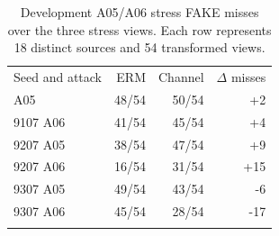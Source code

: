 \begin{table}[t]
\centering
\small
\caption{Development A05/A06 stress FAKE misses over the three stress views. Each row represents 18 distinct sources and 54 transformed views.}\label{tab:attack}
\begin{tabular}{@{}lrrr@{}}
\toprule
Seed and attack & ERM & Channel & $\Delta$ misses \\
\colrule
9107 A05 & 48/54 & 50/54 & +2 \\
9107 A06 & 41/54 & 45/54 & +4 \\
9207 A05 & 38/54 & 47/54 & +9 \\
9207 A06 & 16/54 & 31/54 & +15 \\
9307 A05 & 49/54 & 43/54 & -6 \\
9307 A06 & 45/54 & 28/54 & -17 \\
\botrule
\end{tabular}
\end{table}
